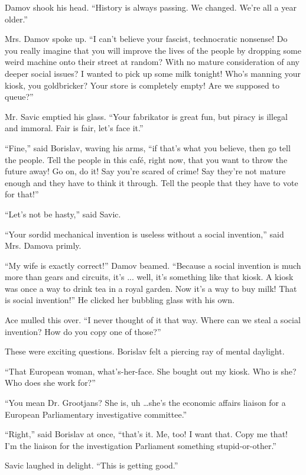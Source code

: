 \documentclass[20 pt,twoside,extrafontsizes,final]{memoir}
\begin{document}
Damov shook his head. ``History is always passing. We changed. We're all a year older.''

Mrs. Damov spoke up. ``I can't believe your fascist, technocratic nonsense! Do you really imagine that you will improve the lives of the people by dropping some weird machine onto their street at random? With no mature consideration of any deeper social issues? I wanted to pick up some milk tonight! Who's manning your kiosk, you goldbricker? Your store is completely empty! Are we supposed to queue?''

Mr. Savic emptied his glass. ``Your fabrikator is great fun, but piracy is illegal and immoral. Fair is fair, let's face it.''

``Fine,'' said Borislav, waving his arms, ``if that's what you believe, then go tell the people. Tell the people in this caf\'e, right now, that you want to throw the future away! Go on, do it! Say you're scared of crime! Say they're not mature enough and they have to think it through. Tell the people that they have to vote for that!''

``Let's not be hasty,'' said Savic.

``Your sordid mechanical invention is useless without a social invention,'' said Mrs. Damova primly.

``My wife is exactly correct!'' Damov beamed. ``Because a social invention is much more than gears and circuits, it's ... well, it's something like that kiosk. A kiosk was once a way to drink tea in a royal garden. Now it's a way to buy milk! That is social invention!'' He clicked her bubbling glass with his own. 

Ace mulled this over. ``I never thought of it that way. Where can we steal a social invention? How do you copy one of those?''

These were exciting questions. Borislav felt a piercing ray of mental daylight.

``That European woman, what's-her-face. She bought out my kiosk. Who is she? Who does she work for?''

``You mean Dr. Grootjans? She is, uh \dots she's the economic affairs liaison for a European Parliamentary investigative committee.''

``Right,'' said Borislav at once, ``that's it. Me, too! I want that. Copy me that! I'm the liaison for the investigation Parliament something stupid-or-other.''

Savic laughed in delight. ``This is getting good.''
\end{document}
